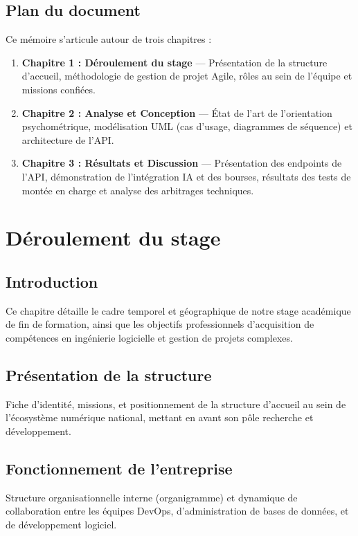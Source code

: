 \documentclass[12pt,a4paper]{report}
\begin{document}
\section{Plan du document}
Ce mémoire s'articule autour de trois chapitres :
\begin{enumerate}
    \item \textbf{Chapitre 1 : Déroulement du stage} — Présentation de la structure d'accueil, méthodologie de gestion de projet Agile, rôles au sein de l'équipe et missions confiées.
    \item \textbf{Chapitre 2 : Analyse et Conception} — État de l'art de l'orientation psychométrique, modélisation UML (cas d'usage, diagrammes de séquence) et architecture de l'API.
    \item \textbf{Chapitre 3 : Résultats et Discussion} — Présentation des endpoints de l'API, démonstration de l'intégration IA et des bourses, résultats des tests de montée en charge et analyse des arbitrages techniques.
\end{enumerate}

\chapter{Déroulement du stage}
\minitoc
\newpage

\section{Introduction}
Ce chapitre détaille le cadre temporel et géographique de notre stage académique de fin de formation, ainsi que les objectifs professionnels d'acquisition de compétences en ingénierie logicielle et gestion de projets complexes.

\section{Présentation de la structure}
Fiche d'identité, missions, et positionnement de la structure d'accueil au sein de l'écosystème numérique national, mettant en avant son pôle recherche et développement.

\section{Fonctionnement de l'entreprise}
Structure organisationnelle interne (organigramme) et dynamique de collaboration entre les équipes DevOps, d'administration de bases de données, et de développement logiciel.
\end{document}
